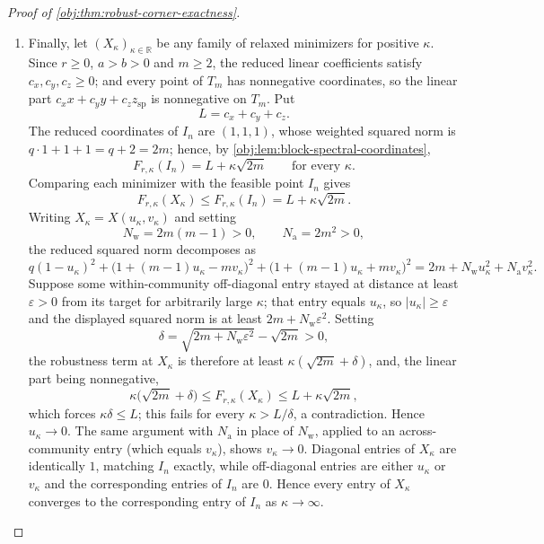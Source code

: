 \begin{proof}[Proof of \cref{obj:thm:robust-corner-exactness}]
\begin{enumerate}
\item Finally, let \((X_\kappa)_{\kappa\in\mathbb R}\) be any family of relaxed
minimizers for positive \(\kappa\).  Since \(r\ge0\), \(a>b>0\) and \(m\ge2\), the reduced linear
coefficients satisfy \(c_x,c_y,c_z\ge0\); and every point of \(T_m\) has nonnegative coordinates, so the linear part \(c_xx+c_yy+c_zz_{\mathrm{sp}}\) is nonnegative on \(T_m\).  Put
\[
L=c_x+c_y+c_z .
\]
The reduced coordinates of \(I_n\) are \((1,1,1)\), whose weighted squared norm is \(q\cdot1+1+1=q+2=2m\); hence, by \cref{obj:lem:block-spectral-coordinates},
\[
F_{r,\kappa}(I_n)=L+\kappa\sqrt{2m}
\qquad\text{for every }\kappa .
\]
Comparing each minimizer with the feasible point \(I_n\) gives
\[
F_{r,\kappa}(X_\kappa)\le F_{r,\kappa}(I_n)=L+\kappa\sqrt{2m}.
\]
Writing \(X_\kappa=X(u_\kappa,v_\kappa)\) and setting
\[
N_{\mathrm{w}}=2m(m-1)>0,
\qquad
N_{\mathrm{a}}=2m^2>0,
\]
the reduced squared norm decomposes as
\[
q(1-u_\kappa)^2+
\bigl(1+(m-1)u_\kappa-mv_\kappa\bigr)^2+
\bigl(1+(m-1)u_\kappa+mv_\kappa\bigr)^2
=
2m+N_{\mathrm{w}}u_\kappa^2+N_{\mathrm{a}}v_\kappa^2 .
\]
Suppose some within-community off-diagonal entry stayed at distance at least \(\varepsilon>0\) from its target for arbitrarily large \(\kappa\); that entry equals \(u_\kappa\), so \(|u_\kappa|\ge\varepsilon\) and the displayed squared norm is at least \(2m+N_{\mathrm{w}}\varepsilon^2\).  Setting
\[
\delta=\sqrt{2m+N_{\mathrm{w}}\varepsilon^2}-\sqrt{2m}>0,
\]
the robustness term at \(X_\kappa\) is therefore at least \(\kappa(\sqrt{2m}+\delta)\), and, the linear part being nonnegative,
\[
\kappa\bigl(\sqrt{2m}+\delta\bigr)\le F_{r,\kappa}(X_\kappa)
\le L+\kappa\sqrt{2m},
\]
which forces \(\kappa\delta\le L\); this fails for every \(\kappa>L/\delta\), a contradiction.  Hence \(u_\kappa\to0\).  The same argument with \(N_{\mathrm{a}}\) in place of \(N_{\mathrm{w}}\), applied to an across-community entry (which equals \(v_\kappa\)), shows \(v_\kappa\to0\).  Diagonal entries of \(X_\kappa\) are identically \(1\), matching \(I_n\) exactly, while off-diagonal entries
are either \(u_\kappa\) or \(v_\kappa\) and the corresponding entries of \(I_n\) are \(0\). Hence every entry of \(X_\kappa\) converges to
the corresponding entry of \(I_n\) as \(\kappa\to\infty\). %
\end{enumerate}
\end{proof}

